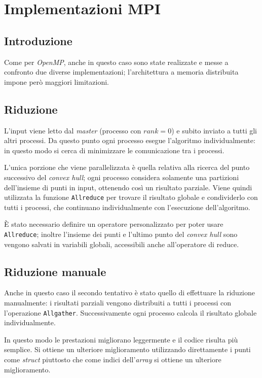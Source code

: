 \section{Implementazioni MPI}
\subsection{Introduzione}
Come per \emph{OpenMP}, anche in questo caso sono state realizzate e messe a confronto due diverse implementazioni; l'architettura a memoria distribuita impone però maggiori limitazioni.

\subsection{Riduzione}
L'input viene letto dal \emph{master} (processo con $rank = 0$) e subito inviato a tutti gli altri processi. Da questo punto ogni processo esegue l'algoritmo individualmente: in questo modo si cerca di minimizzare le comunicazione tra i processi.

L'unica porzione che viene parallelizzata è quella relativa alla ricerca del punto successivo del \emph{convex hull}; ogni processo considera solamente una partizioni dell'insieme di punti in input, ottenendo così un risultato parziale. Viene quindi utilizzata la funzione \texttt{Allreduce} per trovare il risultato globale e condividerlo con tutti i processi, che continuano individualmente con l'esecuzione dell'algoritmo.

È stato necessario definire un operatore personalizzato per poter usare \texttt{Allreduce};
inoltre l'insieme dei punti e l'ultimo punto del \emph{convex hull} sono vengono salvati in variabili globali, accessibili anche all'operatore di reduce.

\subsection{Riduzione manuale}
Anche in questo caso il secondo tentativo è stato quello di effettuare la riduzione manualmente: i risultati parziali vengono distribuiti a tutti i processi con l'operazione \texttt{Allgather}. Successivamente ogni processo calcola il risultato globale individualmente.

In questo modo le prestazioni migliorano leggermente e il codice risulta più semplice.
Si ottiene un ulteriore miglioramento utilizzando direttamente i punti come \emph{struct} piuttosto che come indici dell'\emph{array} si ottiene un ulteriore miglioramento.
